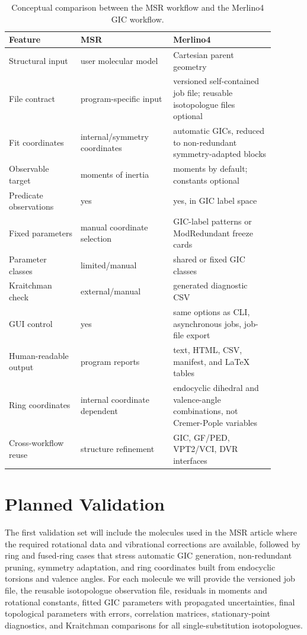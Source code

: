 \documentclass[journal=jctcce,manuscript=article,maxauthors=999]{achemso}
\begin{document}
\begin{table}[h]
\centering
\caption{Conceptual comparison between the MSR workflow and the Merlino4 GIC workflow.}
\label{tab:msr_comparison}
\begin{tabular}{p{0.24\linewidth}p{0.31\linewidth}p{0.34\linewidth}}
\toprule
Feature & MSR & Merlino4 \\
\midrule
Structural input & user molecular model & Cartesian parent geometry \\
File contract & program-specific input & versioned self-contained job file; reusable isotopologue files optional \\
Fit coordinates & internal/symmetry coordinates & automatic GICs, reduced to non-redundant symmetry-adapted blocks \\
Observable target & moments of inertia & moments by default; constants optional \\
Predicate observations & yes & yes, in GIC label space \\
Fixed parameters & manual coordinate selection & GIC-label patterns or ModRedundant freeze cards \\
Parameter classes & limited/manual & shared or fixed GIC classes \\
Kraitchman check & external/manual & generated diagnostic CSV \\
GUI control & yes & same options as CLI, asynchronous jobs, job-file export \\
Human-readable output & program reports & text, HTML, CSV, manifest, and \LaTeX{} tables \\
Ring coordinates & internal coordinate dependent & endocyclic dihedral and valence-angle combinations, not Cremer-Pople variables \\
Cross-workflow reuse & structure refinement & GIC, GF/PED, VPT2/VCI, DVR interfaces \\
\bottomrule
\end{tabular}
\end{table}

\section{Planned Validation}

The first validation set will include the molecules used in the MSR article where the required rotational data and vibrational corrections are available, followed by ring and fused-ring cases that stress automatic GIC generation, non-redundant pruning, symmetry adaptation, and ring coordinates built from endocyclic torsions and valence angles. For each molecule we will provide the versioned job file, the reusable isotopologue observation file, residuals in moments and rotational constants, fitted GIC parameters with propagated uncertainties, final topological parameters with errors, correlation matrices, stationary-point diagnostics, and Kraitchman comparisons for all single-substitution isotopologues.
\end{document}
